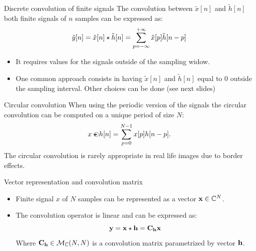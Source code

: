 \begin{block}{Discrete convolution of finite signals}
  The convolution between $\tilde x[n]$ and $\tilde h[n]$ both finite signals of $n$ samples can be expressed as:
  \begin{equation}
      \tilde y[n]=\tilde x[n]\star\tilde h[n] =  \sum_{p=-\infty}^{+\infty}
      \tilde x[p] \tilde h[n-p] 
      \label{eq:conv_finite}\vspace{-3mm}
  \end{equation}
  \begin{itemize}
      \item It requires values for the signals outside of the sampling widow. 
      \item One common approach consists in having $\tilde x[n]$ and $\tilde h[n]$ equal to $0$ outside the sampling interval. Other choices can be done (see next slides)
  \end{itemize}
\end{block}

\begin{block}{Circular convolution}
  When using the periodic version of the signals the circular convolution can be computed on a unique period of size $N$:
  \[
      x {\mbox{$\;\odot \!\!\!\!\!\star~$}} h [n] 
      = \sum_{p=0}^{N-1}
      x[p] h[n-p] .
      \] 
The circular convolution is rarely appropriate in real life images due to border effects.
\end{block}

\begin{block}{Vector representation and convolution matrix}\vspace{-2mm}
  \begin{itemize}
      \item Finite signal $x$ of $N$ samples can be represented as a vector $\mathbf{x}\in\mathbb{C}^N$.
      \item The convolution operator is linear and can be expressed as:\vspace{-1mm}
      $$ \mathbf{y}=\mathbf{x}\star\mathbf{h}= \mathbf{C}_{\mathbf{h}} \mathbf{x} $$
      Where\vspace{-1mm} $\mathbf{C}_{\mathbf{h}}\in \mathcal{M}_\mathbb{C}(N,N)$ is a convolution matrix parametrized by vector $\mathbf{h}$.
  \end{itemize} \vspace{-4mm}
\end{block} %

